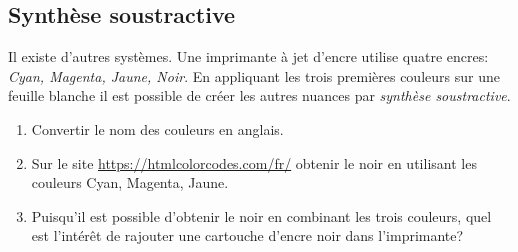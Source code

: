 \documentclass[a4paper,11pt]{article}
\begin{document}
\begin{Form}
\subsection{Synthèse soustractive}
Il existe d'autres systèmes. Une imprimante à jet d'encre utilise quatre encres: \emph{Cyan, Magenta, Jaune, Noir}. En appliquant les trois premières couleurs sur une feuille blanche il est possible de créer les autres nuances par \emph{synthèse soustractive}.
\begin{activite}
\begin{enumerate}
\item Convertir le nom des couleurs en anglais.
\item Sur le site \url{https://htmlcolorcodes.com/fr/} obtenir le noir en utilisant les couleurs Cyan, Magenta, Jaune.
\item Puisqu'il est possible d'obtenir le noir en combinant les trois couleurs, quel est l'intérêt de rajouter une cartouche d'encre noir dans l'imprimante?
\end{enumerate}
\end{activite}
\end{Form}
\end{document}
